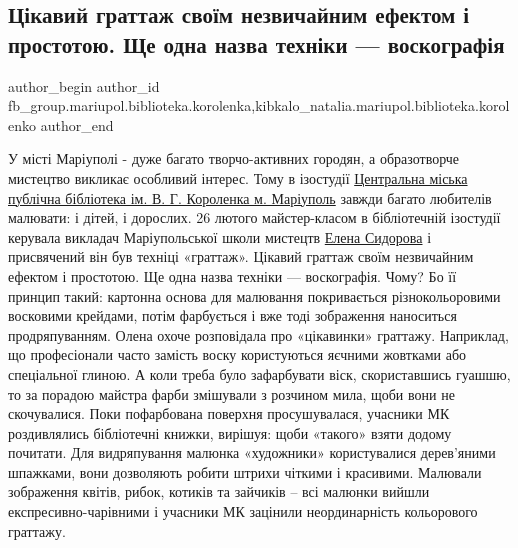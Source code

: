  
 
 
 
 
 
\subsection{Цікавий граттаж своїм незвичайним ефектом і простотою. Ще одна назва техніки — воскографія}
\label{sec:27_02_2020.fb.fb_group.mariupol.biblioteka.korolenka.1.grattazh_voskografia}
 
\ifcmt
 author_begin
   author_id fb_group.mariupol.biblioteka.korolenka,kibkalo_natalia.mariupol.biblioteka.korolenko
 author_end
\fi

У місті Маріуполі - дуже багато творчо-активних городян, а образотворче
мистецтво викликає особливий інтерес. Тому в ізостудії
\href{https://www.facebook.com/groups/1476321979131170}{Центральна міська
публічна бібліотека ім. В. Г. Короленка м. Маріуполь} завжди багато любителів
малювати: і дітей, і дорослих.  26 лютого майстер-класом в бібліотечній
ізостудії керувала викладач Маріупольської школи мистецтв
\href{https://www.facebook.com/ElenaSydorova999}{Елена Сидорова} і присвячений
він був техніці «граттаж». Цікавий граттаж своїм незвичайним ефектом і
простотою. Ще одна назва техніки — воскографія. Чому? Бо її принцип такий:
картонна основа для малювання покривається різнокольоровими восковими крейдами,
потім фарбується і вже тоді зображення наноситься продряпуванням.  Олена охоче
розповідала про «цікавинки» граттажу. Наприклад, що професіонали часто замість
воску користуються яєчними жовтками або спеціальної глиною. А коли треба було
зафарбувати віск, скориставшись гуашшю, то за порадою майстра фарби змішували з
розчином мила, щоби вони не скочувалися. Поки пофарбована поверхня
просушувалася, учасники МК роздивлялись бібліотечні книжки, вирішуя: щоби
«такого» взяти додому почитати. Для видряпування малюнка «художники»
користувалися дерев'яними шпажками, вони дозволяють робити штрихи чіткими і
красивими. Малювали зображення квітів, рибок, котиків та зайчиків – всі малюнки
вийшли експресивно-чарівними і учасники МК зацінили неординарність кольорового
граттажу.

